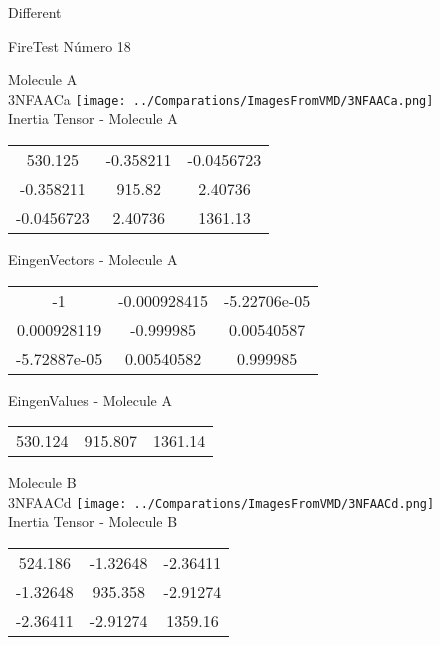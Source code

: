 \begin{center}
\vtab
\vtab
\textcolor{NavyBlue}{\Large Different}
\end{center}

 \newpage

\vtab[-2cm]
\begin{center}
{\large FireTest \tab Número 18}
\end{center}
\begin{multicols}{2}
\begin{center}

Molecule A \\ 
3NFAACa
\texttt{[image: ../Comparations/ImagesFromVMD/3NFAACa.png]}
\\
Inertia Tensor - Molecule A \\
\vtab

\begin{tabular}{|c c c|}
530.125	 & 	-0.358211	 & 	-0.0456723	 \\
-0.358211	 & 	915.82	 & 	2.40736	 \\
-0.0456723	 & 	2.40736	 & 	1361.13
\end{tabular}

\vtab
 EingenVectors - Molecule A     \\
\vtab
\begin{tabular}{|c c c|}
-1	 & 	-0.000928415	 & 	-5.22706e-05	 \\
0.000928119	 & 	-0.999985	 & 	0.00540587	 \\
-5.72887e-05	 & 	0.00540582	 & 	0.999985
\end{tabular}

\vtab
 EingenValues - Molecule A     \\
\vtab
\begin{tabular}{|c c c|}
530.124	 & 	915.807	 & 	1361.14	 \\
\end{tabular}
\columnbreak

Molecule B \\ 
3NFAACd
\texttt{[image: ../Comparations/ImagesFromVMD/3NFAACd.png]}
\\
Inertia Tensor - Molecule B \\
\vtab

\begin{tabular}{|c c c|}
524.186	 & 	-1.32648	 & 	-2.36411	 \\
-1.32648	 & 	935.358	 & 	-2.91274	 \\
-2.36411	 & 	-2.91274	 & 	1359.16
\end{tabular}


\end{center}
\end{multicols}
